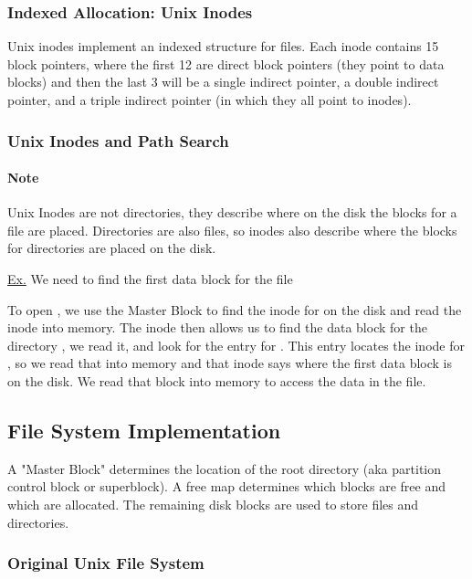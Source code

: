 \documentclass{article}
\begin{document}
\subsubsection{Indexed Allocation: Unix Inodes}

Unix inodes implement an indexed structure for files. Each inode contains 15 block pointers, where the first 12 are direct block pointers (they point to data blocks) and then the last 3 will be a single indirect pointer, a double indirect pointer, and a triple indirect pointer (in which they all point to inodes).

\subsubsection{Unix Inodes and Path Search}

\paragraph{Note} Unix Inodes are not directories, they describe where on the disk the blocks for a file are placed. Directories are also files, so inodes also describe where the blocks for directories are placed on the disk.

\underline{Ex.} We need to find the first data block for the file 

To open , we use the Master Block to find the inode for \codeword{/} on the disk and read the inode into memory. The inode then allows us to find the data block for the directory \codeword{/}, we read it, and look for the entry for . This entry locates the inode for , so we read that into memory and that inode says where the first data block is on the disk. We read that block into memory to access the data in the file.

\subsection{File System Implementation}

A "Master Block" determines the location of the root directory (aka partition control block or superblock). A free map determines which blocks are free and which are allocated. The remaining disk blocks are used to store files and directories.

\subsubsection{Original Unix File System}
\end{document}
